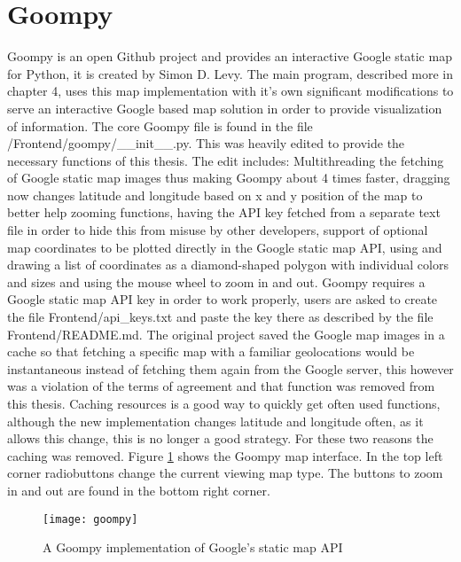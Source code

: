 \section{Goompy}
Goompy\cite{goompy} is an open Github project and provides an interactive Google static map\cite{googleSM} for Python, it is created by Simon D. Levy. The main program, described more in chapter 4, uses this map implementation with it's own significant modifications to serve an interactive Google based map solution in order to provide visualization of information. The core Goompy file is found in the file /Frontend/goompy/\_\_init\_\_.py. This was heavily edited to provide the necessary functions of this thesis. The edit includes: Multithreading the fetching of Google static map images thus making Goompy about 4 times faster, dragging now changes latitude and longitude based on x and y position of the map to better help zooming functions, having the API key fetched from a separate text file in order to hide this from misuse by other developers, support of optional map coordinates to be plotted directly in the Google static map API, using and drawing a list of coordinates as a diamond-shaped polygon with individual colors and sizes and using the mouse wheel to zoom in and out. Goompy requires a Google static map API key in order to work properly, users are asked to create the file Frontend/api\_keys.txt and paste the key there as described by the file Frontend/README.md. The original project saved the Google map images in a cache so that fetching a specific map with a familiar geolocations would be instantaneous instead of fetching them again from the Google server, this however was a violation of the terms of agreement and that function was removed from this thesis. Caching resources is a good way to quickly get often used functions, although the new implementation changes latitude and longitude often, as it allows this change, this is no longer a good strategy. For these two reasons the caching was removed.
Figure \ref{fig:the_goompy} shows the Goompy map interface. In the top left corner radiobuttons change the current viewing map type. The buttons to zoom in and out are found in the bottom right corner.

\begin{figure}[ht]
\texttt{[image: goompy]}
\centering
\caption{A Goompy implementation of Google's static map API}
\label{fig:the_goompy}
\end{figure}